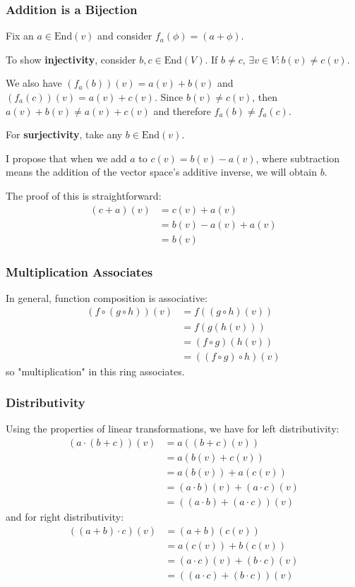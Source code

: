 \documentclass[12pt]{article}
\begin{document}
\subsubsection{Addition is a Bijection}

Fix an $a \in \mathrm{End}(v)$ and consider $f_a(\phi)=(a+\phi)$.

To show \textbf{injectivity}, consider $b, c \in \mathrm{End}(V)$.
If $b \ne c$, $\exists v \in V: b(v) \ne c(v)$.

We also have $(f_a(b))(v)=a(v)+b(v)$ and $(f_a(c))(v)=a(v)+c(v)$.
Since $b(v) \ne c(v)$, then $a(v)+b(v) \ne a(v)+c(v)$
and therefore $f_a(b) \ne f_a(c)$.

For \textbf{surjectivity}, take any $b \in \mathrm{End}(v)$.

I propose that when we add $a$ to $c(v)=b(v)-a(v)$, where subtraction
means the addition of the vector space's additive inverse, we will obtain $b$.

The proof of this is straightforward:
\begin{align*}
  (c+a)(v)
   & = c(v)+a(v)      \\
   & = b(v)-a(v)+a(v) \\
   & = b(v)
\end{align*}

\subsubsection{Multiplication Associates}

In general, function composition is associative:
\begin{align*}
  (f \circ (g \circ h))(v)
   & = f((g \circ h)(v))        \\
   & = f(g(h(v)))               \\
   & = (f \circ g)(h(v))        \\
   & = ((f \circ g) \circ h)(v)
\end{align*}
so "multiplication" in this ring associates.

\subsubsection{Distributivity}

Using the properties of linear transformations, we have for left distributivity:
\begin{align*}
  (a \cdot (b+c))(v)
   & = a((b+c)(v))                     \\
   & = a(b(v)+c(v))                    \\
   & = a(b(v))+a(c(v))                 \\
   & = (a \cdot b)(v) + (a \cdot c)(v) \\
   & = ((a \cdot b) + (a \cdot c))(v)
\end{align*}
and for right distributivity:
\begin{align*}
  ((a+b) \cdot c)(v)
   & = (a+b)(c(v))                     \\
   & = a(c(v))+b(c(v))                 \\
   & = (a \cdot c)(v) + (b \cdot c)(v) \\
   & = ((a \cdot c) + (b \cdot c))(v)
\end{align*}
\end{document}
